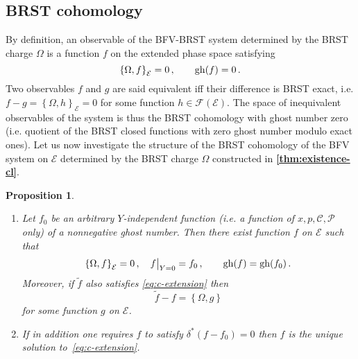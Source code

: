 \documentclass[a4paper,11pt]{amsart}
\newtheorem{prop}[thm]{Proposition}
\numberwithin{thm}{section} %
\numberwithin{equation}{section} %
\numberwithin{figure}{section} %
\newcommand{\bref}[1]{{\bf \ref{#1}}}
\newcommand{\pb}[2]{\left\{{}#1{},{}#2{}\right\}}
\newcommand{\gh}[1]{{\rm gh}(#1)}
\renewcommand{\:}{{\rm\, :\,}}
\def\cP{{\mathcal P}}
\def\cc{{\mathcal C}}
\def\cF{{\mathcal F}}
\def\E{{ \mathcal E}}
\begin{document}
\subsection{BRST cohomology}
By definition, an observable of the
BFV-BRST system determined by the BRST charge
$\Omega$ is a function $f$ on the extended phase
space satisfying
\begin{equation}
\pb{\Omega}{f}_\E=0\,, \qquad \gh{f}=0\,.
\end{equation}
Two observables $f$ and $g$ are said equivalent iff their difference
is BRST exact, i.e. $f-g=\pb{\Omega}{h}_\E=0$ for some function
$h\in\cF(\E)$. The space of inequivalent observables of the system is
thus the BRST cohomology with ghost number zero (i.e. quotient of the
BRST closed functions with zero ghost number modulo exact ones).  Let
us now investigate the structure of the BRST cohomology of the BFV
system on $\E$ determined by the BRST charge $\Omega$ constructed in
\bref{thm:existence-cl}.
\begin{prop}\label{prop:extension-cl}
\begin{enumerate}
\item 
Let $f_0$ be an arbitrary $Y$-independent function (i.e. a function of
$x,p,\cc,\cP$ only) of a nonnegative ghost number. Then there exist
function $f$ on $\E$ such that
\begin{equation}
\label{eq:c-extension}
\pb{\Omega}{f}_{\E}=0\,, \quad f{\bigr|}_{Y=0}=f_0\,,\qquad \gh{f}=\gh{f_0}\,.
\end{equation}
Moreover, if $\tilde f$ also satisfies \eqref{eq:c-extension} then
\begin{equation}
  \label{eq:c-arbitrarines}
{\tilde f} -f =\pb{\Omega}{g}
\end{equation}
for some function $g$ on $\E$.
\item If in addition one requires $f$ to satisfy $\delta^* (f-f_0)=0$
then $f$ is the unique solution to~\eqref{eq:c-extension}.
\end{enumerate}
\end{prop}
\end{document}
